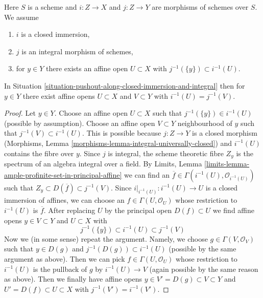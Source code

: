 \begin{situation}
\label{situation-pushout-along-closed-immersion-and-integral}
Here $S$ is a scheme and $i : Z \to X$ and $j : Z \to Y$
are morphisms of schemes over $S$. We assume
\begin{enumerate}
\item $i$ is a closed immersion,
\item $j$ is an integral morphism of schemes,
\item for $y \in Y$ there exists an affine open $U \subset X$
with $j^{-1}(\{y\}) \subset i^{-1}(U)$.
\end{enumerate}
\end{situation}

\begin{lemma}
\label{lemma-prepare-pushout-along-closed-immersion-and-integral}
In Situation \ref{situation-pushout-along-closed-immersion-and-integral}
then for $y \in Y$ there exist affine opens $U \subset X$ and
$V \subset Y$ with $i^{-1}(U) = j^{-1}(V)$.
\end{lemma}

\begin{proof}
Let $y \in Y$. Choose an affine open $U \subset X$
such that $j^{-1}(\{y\}) \in i^{-1}(U)$ (possible by assumption).
Choose an affine open $V \subset Y$ neighbourhood of $y$
such that $j^{-1}(V) \subset i^{-1}(U)$.
This is possible because $j : Z \to Y$ is a closed morphism
(Morphisms, Lemma \ref{morphisms-lemma-integral-universally-closed}) and
$i^{-1}(U)$ contains the fibre over $y$.
Since $j$ is integral, the scheme theoretic fibre $Z_y$
is the spectrum of an algebra integral over a field.
By Limits, Lemma \ref{limits-lemma-ample-profinite-set-in-principal-affine}
we can find an $\overline{f} \in \Gamma(i^{-1}(U), \mathcal{O}_{i^{-1}(U)})$
such that $Z_y \subset D(\overline{f}) \subset j^{-1}(V)$.
Since $i|_{i^{-1}(U)} : i^{-1}(U) \to U$ is a closed immersion
of affines, we can choose an $f \in \Gamma(U, \mathcal{O}_U)$
whose restriction to $i^{-1}(U)$ is $\overline{f}$.
After replacing $U$ by the principal open $D(f) \subset U$
we find affine opens $y \in V \subset Y$ and $U \subset X$ with
$$
j^{-1}(\{y\}) \subset i^{-1}(U) \subset j^{-1}(V)
$$
Now we (in some sense) repeat the argument. Namely, we choose
$g \in \Gamma(V, \mathcal{O}_V)$ such that $y \in D(g)$ and
$j^{-1}(D(g)) \subset i^{-1}(U)$ (possible by the same argument
as above). Then we can pick $f \in \Gamma(U, \mathcal{O}_U)$
whose restriction to $i^{-1}(U)$ is the pullback of $g$
by $i^{-1}(U) \to V$ (again possible by the same reason as above).
Then we finally have affine opens $y \in V' = D(g) \subset V \subset Y$
and $U' = D(f) \subset U \subset X$ with $j^{-1}(V') = i^{-1}(V')$.
\end{proof}

